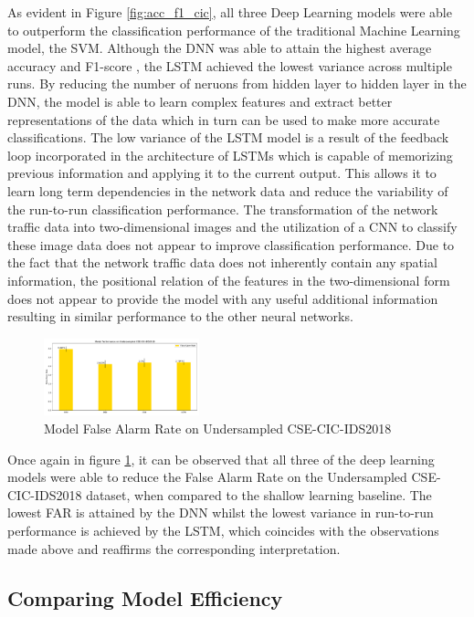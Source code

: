 \documentclass[conference]{IEEEtran}
\begin{document}
As evident in Figure \ref{fig:acc_f1_cic}, all three Deep Learning models were able to outperform the classification performance of the traditional Machine Learning model, the SVM. Although the DNN was able to attain the highest average accuracy and F1-score , the LSTM achieved the lowest variance across multiple runs. By reducing the number of neruons from hidden layer to hidden layer in the DNN, the model is able to learn complex features and extract better representations of the data which in turn can be used to make more accurate classifications. The low variance of the LSTM  model is a result of the feedback loop incorporated in the architecture of LSTMs which is capable of memorizing previous information and applying it to the current output. This allows it to learn long term dependencies in the network data and reduce the variability of the run-to-run classification performance. The transformation of the network traffic data into two-dimensional images and the utilization of a CNN to classify these image data does not appear to improve classification performance. Due to the fact that the network traffic data does not inherently contain any spatial information, the positional relation of the features in the two-dimensional form does not appear to provide the model with any useful additional information resulting in similar performance to the other neural networks.



\begin{figure}[!htpb]
  \centering
  \includegraphics[width=0.4\textwidth]{images/far_cic.pdf}
  \caption{Model False Alarm Rate on Undersampled CSE-CIC-IDS2018}
  \label{fig:far_cic}
\end{figure}

Once again in figure \ref{fig:far_cic}, it can be observed that all three of the deep learning models were able to reduce the False Alarm Rate on the Undersampled CSE-CIC-IDS2018 dataset, when compared to the shallow learning baseline. The lowest FAR is attained by the DNN whilst the lowest variance in run-to-run performance is achieved by the LSTM, which coincides with the observations made above and reaffirms the corresponding interpretation. 

\subsection{Comparing Model Efficiency}
\end{document}
